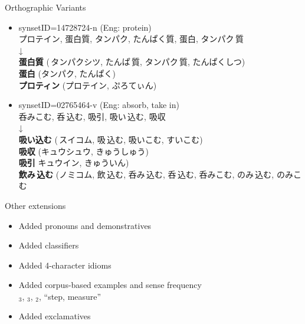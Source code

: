 \documentclass{beamer}
\begin{document}
\begin{frame}{Orthographic Variants}

  {\jafont
  \begin{itemize}
  \item synsetID=14728724-n (Eng: protein)
    \\ プロテイン, 蛋白質, タンパク, たんぱく質, 蛋白, タンパク\,質
    \\ \hspace{15em} ↓
    \\ \textbf{蛋白質} (\,タンパクシツ, たんぱ\,質, タンパク\,質, たんぱくしつ)
    \\ \textbf{蛋白} (タンパク, たんぱく)
    \\ \textbf{プロティン} (プロテイン, ぷろてぃん)
  \item synsetID=02765464-v (Eng: absorb, take in)
    \\ 呑みこむ, 呑\,込む, 吸引, 吸い\,込む, 吸収
    \\\hspace{20em} ↓
    \\ \textbf{吸い込む}  (\,スイコム, 吸\,込む, 吸いこむ, すいこむ)
    \\ \textbf{吸収} (キュウシュウ, きゅうしゅう)
    \\ \textbf{吸引} キュウイン, きゅういん)
    \\ \textbf{飲み\,込む} (ノミコム, 飲\,込む, 呑み\,込む, 呑\,込む, 呑みこむ, のみ\,込む, のみこむ
  \end{itemize}}
\end{frame}

\begin{frame}{Other extensions}
  \begin{itemize}
  \item Added pronouns and demonstratives
    \\ 
  \item Added classifiers
    \\ 
  \item Added 4-character idioms
    \\ 
  \item Added corpus-based examples and sense frequency
    \\ $_3$, $_3$, $_2$,
    ``step, measure''
   \item Added exclamatives
    \\ 
  \end{itemize}
\end{frame}
\end{document}
